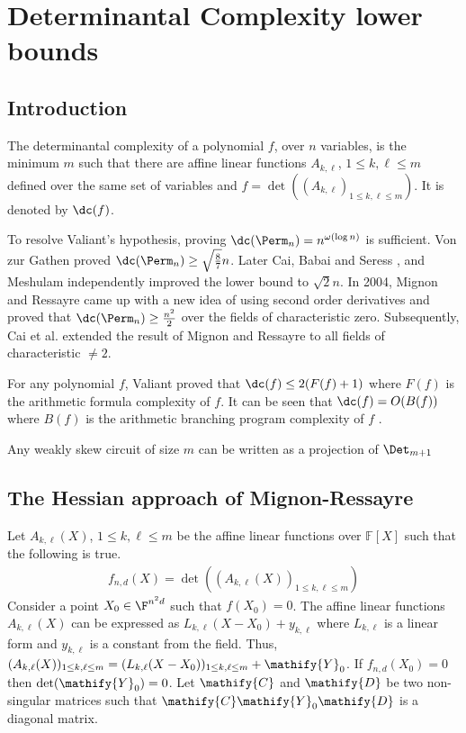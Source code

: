 \chapter{Determinantal Complexity lower bounds}
\section{Introduction}
\begin{definition}
  The determinantal complexity of a polynomial $f$, over $n$ variables, is the minimum $m$ such that there are affine linear functions $A_{k,\ell}$, $1\leq k,\ell\leq m$ defined over the same set of variables and $f= \det((A_{k,\ell})_{1 \leq k,\ell \leq m})$. It is denoted by $\dc(f)$.  
\end{definition}
To resolve Valiant's hypothesis, proving $\dc(\Perm_n) = n^{\omega(\log n)}$ is sufficient. Von zur Gathen \cite{von1986}  proved $\dc(\Perm_n) \geq \sqrt{\frac{8}{7}}n$. Later Cai\cite{cai1990}, Babai and Seress \cite{von1987}, and Meshulam\cite{mesh1989} independently improved the lower bound to $\sqrt{2}n$. In 2004, Mignon and Ressayre\cite{mt2004} came up with a new idea of using second order derivatives and proved that $\dc(\Perm_n) \geq \frac{n^2}{2}$ over the fields of characteristic zero. Subsequently, Cai et al.\cite{ccl2008} extended the result of Mignon and Ressayre to all fields of characteristic $\neq 2$.

For any polynomial $f$, Valiant\cite{val1979} proved that $\dc(f) \leq 2(F(f)+ 1)$ where $F(f)$ is the arithmetic formula complexity of $f$. It can be seen that $\dc(f) = O(B(f))$ where $B(f)$ is the arithmetic branching program complexity of $f$ \cite{mp2008}.

\begin{remark}
  Any weakly skew circuit of size $m$ can be written as a projection of $\Det_{m+1}$
\end{remark}


\section{The Hessian approach of Mignon-Ressayre}

 Let $A_{k,\ell}(X)$, $1\leq k,\ell\leq m$ be the affine linear functions over $\mathbb{F}[X]$ such that the following is true.
\begin{align*}
  f_{n,d}(X) = \det((A_{k,\ell}(X))_{1\leq k,\ell\leq m})
\end{align*}
 Consider a point $X_0\in \F^{n^2d}$ such that $f(X_0)=0$. The affine linear functions $A_{k,\ell}(X)$ can be expressed as $L_{k,\ell}(X-X_0) + y_{k,\ell}$ where $L_{k,\ell}$ is a linear form and $y_{k,\ell}$ is a constant from the field. Thus, $(A_{k,\ell}(X))_{1\leq k,\ell\leq m} = (L_{k,\ell}(X-X_0))_{1\leq k,\ell\leq m} + \mathify{Y}_0$. If $f_{n,d}(X_0)=0$ then $\det(\mathify{Y}_0)=0$. Let $\mathify{C}$ and $\mathify{D}$ be two non-singular matrices such that $\mathify{C}\mathify{Y}_0\mathify{D}$ is a diagonal matrix.

